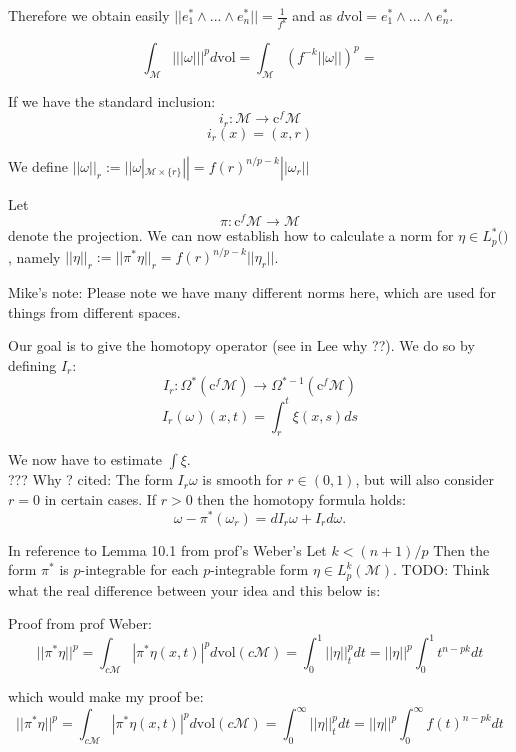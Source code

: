 \documentclass[licencjacka]{pracamgr}
\begin{document}
\normalsize

Therefore we obtain easily $||e_1^{\ast} \wedge ... \wedge e_n^\ast || =
\frac{1}{f^k}$ and as $d\mathrm{vol} = e_1^{\ast} \wedge ... \wedge e_n^\ast $.


\[
    \int_{\mathcal{M}} ||| \omega |||^p d\mathrm{vol} = 
    \int_{\mathcal{M}}  (f^{-k}|| \omega ||)^p =  
\]

If we have the standard inclusion:
\[
    i_r: \mathcal{M} \rightarrow \mathrm{c}^f \mathcal{M}
\]
\[
    i_r(x) = (x, r)
\]

We define $|| \omega ||_r := || \omega |_{\mathcal{M} \times \{r\}} ||
= f(r)^{n/p - k} ||\omega_r||$

Let
\[
    \pi:\mathrm{c}^f \mathcal{M} \rightarrow \mathcal{M}
\]
denote the projection. We can now establish how to calculate a norm
for $\eta \in L^\ast_p(\mathcal)$, namely 
$||\eta||_r := ||\pi^\ast\eta||_r = f(r)^{n/p - k} ||\eta_r||$.


\scriptsize
Mike's note: Please note we have many different norms here, which
are used for things from different spaces.
\normalsize

Our goal is to give the homotopy operator (see in Lee why ??). We do so by
defining $I_r$:
\[
  I_r: \Omega^\ast( \mathrm{c}^f \mathcal{M} ) \rightarrow
  \Omega^{\ast-1}(\mathrm{c}^f \mathcal{M} ) 
\]
\[
    I_r(\omega)(x, t) = \int_r^t \xi(x, s) ds
\]

We now have to estimate $\int \xi$. \\

??? Why ?
cited:
The form $I_r\omega$ is smooth for $r \in (0,1)$, but will also consider
$r=0$ in certain cases. If $r>0$ then the homotopy formula holds:
\[
    \omega - \pi^\ast(\omega_r) = d I_r\omega + I_rd\omega.
\] 

In reference to Lemma 10.1 from prof's Weber's
Let $k < (n+1)/p $ Then the form $\pi^\ast$ is $p$-integrable for each 
$p$-integrable form $\eta \in L^k_p(\mathcal{M})$. TODO: Think what the real
difference between your idea and this below is:

Proof from prof Weber:
\[
    ||\pi^\ast \eta ||^p = 
    \int_{c \mathcal{M}} |\pi^\ast \eta(x,t)|^p d \mathrm{vol}(c\mathcal{M}) = 
    \int_0^1 ||\eta||_t^p dt = ||\eta||^p \int_0^1t^{n-pk} dt
\]

which would make my proof be:
\[
    ||\pi^\ast \eta ||^p = 
    \int_{c \mathcal{M}} |\pi^\ast \eta(x,t)|^p d \mathrm{vol}(c\mathcal{M}) = 
    \int_0^\infty ||\eta||_t^p dt = ||\eta||^p \int_0^\infty f(t)^{n-pk} dt
\]
\end{document}
